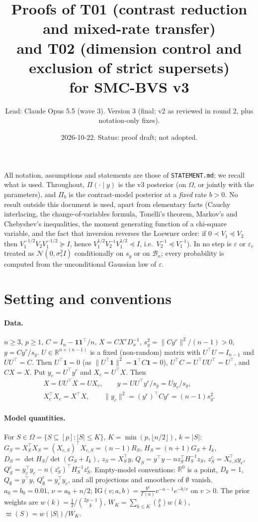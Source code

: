 \documentclass[11pt]{article}
\title{Proofs of T01 (contrast reduction and mixed-rate transfer)\\ and T02 (dimension control and exclusion of strict supersets)\\ for SMC-BVS v3}
\author{Lead: Claude Opus 5.5 (wave 3). Version 3 (final; v2 as reviewed in round 2, plus notation-only fixes).}
\date{2026-10-22. Status: proof draft; not adopted.}
\theoremstyle{remark}
\newcommand{\R}{\mathbb R}
\newcommand{\IG}{\mathrm{IG}}
\newcommand{\N}{\mathcal N}
\newcommand{\tr}{^{\top}}
\newcommand{\vp}{\varpi}
\newcommand{\Om}{\Omega}
\newcommand{\B}{\mathcal B}
\newcommand{\sy}{s_y}
\newcommand{\yc}{y_c}
\newcommand{\Xc}{X_c}
\newcommand{\eps}{\varepsilon}
\begin{document}
\maketitle

\noindent All notation, assumptions and statements are those of \texttt{STATEMENT.md}; we recall what is used. Throughout, $\Pi(\cdot\mid y)$ is the v3 posterior (on $\Om$, or jointly with the parameters), and $\Pi_b$ is the contrast-model posterior at a \emph{fixed} rate $b>0$. No result outside this document is used, apart from elementary facts (Cauchy interlacing, the change-of-variables formula, Tonelli's theorem, Markov's and Chebyshev's inequalities, the moment generating function of a chi-square variable, and the fact that inversion reverses the Loewner order: if $0\prec V_1\preceq V_2$ then $V_1^{-1/2}V_2V_1^{-1/2}\succeq I$, hence $V_1^{1/2}V_2^{-1}V_1^{1/2}\preceq I$, i.e.\ $V_2^{-1}\preceq V_1^{-1}$). In no step is $\eps$ or $\eps_c$ treated as $\N(0,\sigma_*^2I)$ conditionally on $\sy$ or on $\B_n$; every probability is computed from the unconditional Gaussian law of $\eps$.

\tableofcontents

\section{Setting and conventions}\label{sec:setting}

\paragraph{Data.} $n\ge3$, $p\ge1$, $C=I_n-\mathbf 1\mathbf 1\tr/n$, $X=CX^rD_x^{-1}$, $\sy^2=\|Cy^r\|^2/(n-1)>0$, $y=Cy^r/\sy$. $U\in\R^{n\times(n-1)}$ is a fixed (non-random) matrix with $U\tr U=I_{n-1}$ and $UU\tr=C$. Then $U\tr\mathbf 1=0$ (as $\|U\tr\mathbf 1\|^2=\mathbf 1\tr C\mathbf 1=0$), $U\tr C=U\tr UU\tr=U\tr$, and $CX=X$. Put $\yc=U\tr y^r$ and $\Xc=U\tr X$. Then
\begin{equation}\label{eq:UX}
\begin{gathered}
X=UU\tr X=U\Xc,\qquad y=UU\tr y^r/\sy=U\yc/\sy,\\
\Xc\tr\Xc=X\tr X,\qquad \|\yc\|^2=(y^r)\tr Cy^r=(n-1)\sy^2 .
\end{gathered}
\end{equation}

\paragraph{Model quantities.} For $S\in\Om=\{S\subseteq[p]:|S|\le K\}$, $K=\min(p,\lfloor n/2\rfloor)$, $k=|S|$: $G_S=X_S\tr X_S=(X_{c,S})\tr X_{c,S}=(n-1)R_S$, $H_S=(n+1)G_S+I_k$, $D_S=\det H_S/\det(G_S+I_k)$, $z_S=X_S\tr y$, $Q_S=y\tr y-nz_S\tr H_S^{-1}z_S$, $z_S^c=X_{c,S}\tr\yc$, $Q^c_S=\yc\tr\yc-n(z^c_S)\tr H_S^{-1}z^c_S$. Empty-model conventions: $\R^{0}$ is a point, $D_\emptyset=1$, $Q_\emptyset=y\tr y$, $Q^c_\emptyset=\yc\tr\yc$, and all projections and smoothers of $\emptyset$ vanish. $a_0=b_0=0.01$, $\nu=a_0+n/2$; $\IG(v;a,b)=\frac{b^a}{\Gamma(a)}v^{-a-1}e^{-b/v}$ on $v>0$. The prior weights are $w(k)=\tfrac12/\binom{2p-1}{k}$, $W_K=\sum_{k\le K}\binom pkw(k)$, $\vp(S)=w(|S|)/W_K$.
\end{document}
